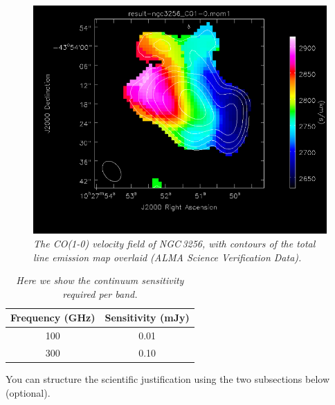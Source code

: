 \documentclass[12pt,a4paper]{article}  %
\begin{document}
\begin{figure}[tbh]
\includegraphics[scale=0.2]{CO_velfield.png}
\caption{\em{The CO(1-0) velocity field of NGC\,3256, with contours 
of the total line emission map overlaid (ALMA Science Verification Data).
}}
\end{figure}

\begin{table}[tbh]
\begin{center}
\caption[]{\em{Here we show the continuum sensitivity required per band.}}
\begin{tabular}{cc}
\hline \noalign {\smallskip}
Frequency (GHz) & Sensitivity (mJy) \\
\hline \noalign {\smallskip}
100 & 0.01 \\
300 & 0.10 \\
\end{tabular}
\end{center}
\end{table}

You can structure the scientific justification using the two subsections below (optional).
\end{document}
